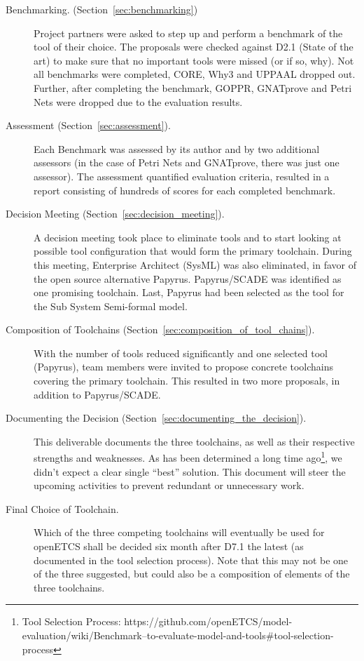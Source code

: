 \begin{description}

\item[Benchmarking. (Section~\ref{sec:benchmarking})] Project partners were asked to step up and perform a benchmark of the tool of their choice.  The proposals were checked against D2.1 (State of the art) to make sure that no important tools were missed (or if so, why).  Not all benchmarks were completed, CORE, Why3 and UPPAAL dropped out.  Further, after completing the benchmark, GOPPR, GNATprove and Petri Nets were dropped due to the evaluation results.

\item[Assessment (Section~\ref{sec:assessment}).] Each Benchmark was assessed by its author and by two additional assessors (in the case of Petri Nets and GNATprove, there was just one assessor).  The assessment quantified evaluation criteria, resulted in a report consisting of hundreds of scores for each completed benchmark.

\item[Decision Meeting (Section~\ref{sec:decision_meeting}).] A decision meeting took place to eliminate tools and to start looking at possible tool configuration that would form the primary toolchain.  During this meeting, Enterprise Architect (SysML) was also eliminated, in favor of the open source alternative Papyrus.  Papyrus/SCADE was identified as one promising toolchain.  Last, Papyrus had been selected as the tool for the Sub System Semi-formal model.

\item[Composition of Toolchains (Section~\ref{sec:composition_of_tool_chains}).] With the number of tools reduced significantly and one selected tool (Papyrus), team members were invited to propose concrete toolchains covering the primary toolchain.  This resulted in two more proposals, in addition to Papyrus/SCADE.

\item[Documenting the Decision (Section~\ref{sec:documenting_the_decision}).] This deliverable documents the three toolchains, as well as their respective strengths and weaknesses.  As has been determined a long time ago\footnote{Tool Selection Process: https://github.com/openETCS/model-evaluation/wiki/Benchmark--to-evaluate-model-and-tools\#tool-selection-process}, we didn't expect a clear single ``best'' solution.  This document will steer the upcoming activities to prevent redundant or unnecessary work.

\item[Final Choice of Toolchain.] Which of the three competing toolchains will eventually be used for openETCS shall be decided six month after D7.1 the latest (as documented in the tool selection process).  Note that this may not be one of the three suggested, but could also be a composition of elements of the three toolchains.

\end{description}

